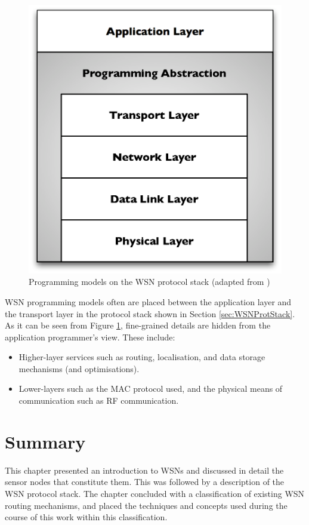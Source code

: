 \begin{figure}
\centering
\includegraphics[scale=0.61]{img/ProtStack_ProgAbstr.eps}
\caption[Programming models on the WSN protocol stack]{Programming models on the WSN protocol
stack (adapted from \cite{mottola_middleware:2008})}
\label{Fig:ProtStack_ProgAbstr}
\end{figure}

WSN programming models often are placed between the application layer and the
transport layer in the protocol stack shown in Section \ref{sec:WSNProtStack}. As it can be seen from
Figure \ref{Fig:ProtStack_ProgAbstr},
fine-grained details are hidden from the application programmer's view. These
include:

\begin{itemize}
  \item Higher-layer services such as routing, localisation, and data storage
  mechanisms (and optimisations).
  \item Lower-layers such as the MAC protocol used, and the physical means of
  communication such as RF communication.
\end{itemize}

\section{Summary}
This chapter presented an introduction to WSNs and discussed in detail the 
sensor nodes that constitute them. This was followed by a description of the WSN
protocol stack. The chapter concluded with a classification of
existing WSN routing mechanisms, and placed the techniques and concepts used during the course of
this work within this classification.



